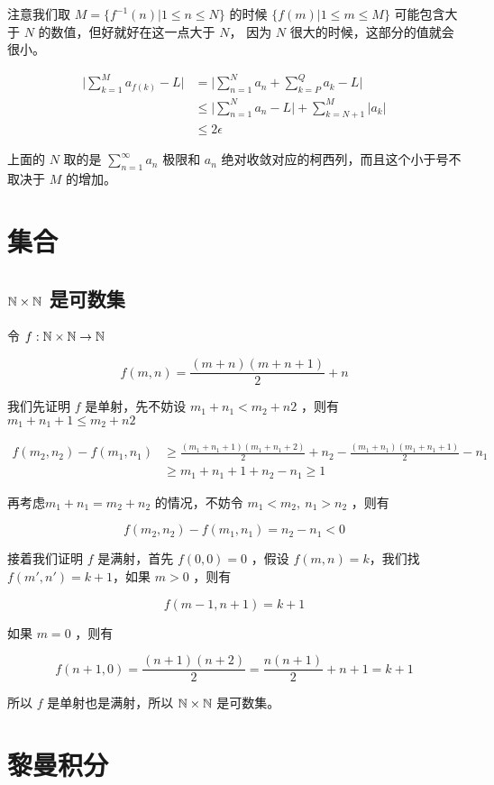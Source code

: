 注意我们取 $M = \{ f^{-1}(n) \vert 1 \le n \le N \} $ 的时候 $ \{ f(m) \vert 1 \le m \le M \}$ 可能包含大于 $N$ 的数值，但好就好在这一点大于 $N$，
因为 $N$ 很大的时候，这部分的值就会很小。

\begin{align*}
\lvert \sum_{k=1}^{M}a_{f(k)} - L \rvert & =  \lvert \sum_{n=1}^{N}a_{n} + \sum_{k=P}^{Q}a_{k} - L \rvert \\
& \le \lvert \sum_{n=1}^{N}a_n - L \rvert + \sum_{k=N+1}^{M}\lvert a_k \rvert \\
& \le 2\epsilon
\end{align*}

上面的 $N$ 取的是 $\sum_{n=1}^{\infty}a_n$ 极限和 $a_n$ 绝对收敛对应的柯西列，而且这个小于号不取决于 $M$ 的增加。


\section{集合}

\subsection{$\mathbb{N} \times \mathbb{N}$ 是可数集}

令 $f: \mathbb{N} \times \mathbb{N} \to \mathbb{N}$

\[
f(m,n) = \frac{(m+n)(m+n+1)}{2} + n
\]

我们先证明 $f$ 是单射，先不妨设 $m_1+ n_1 < m_2 + n2$ ，则有 $ m_1+ n_1 + 1 \le m_2 + n2$

\begin{align*}
f(m_2, n_2) - f(m_1, n_1) & \ge \frac{(m_1+n_1+1)(m_1+n_1 + 2)}{2} + n_2 - \frac{(m_1+n_1)(m_1+n_1+1)}{2} - n_1 \\
    & \ge m_1+n_1+1 + n_2 - n_1 \ge 1
\end{align*}

再考虑$m_1 + n_1 = m_2 + n_2$ 的情况，不妨令 $m_1 < m_2, \: n_1 > n_2$ ，则有

\[
f(m_2,n_2) - f(m_1, n_1) = n_2 - n_1 < 0
\]

接着我们证明 $f$ 是满射，首先 $f(0, 0) = 0$ ，假设 $f(m,n) = k$，我们找 $f(m',n') = k+1$，如果 $m > 0$ ，则有 

\[
f(m-1,n+1) = k +1
\]

如果 $m = 0$ ，则有

\[
f(n+1, 0) = \frac{(n+1)(n+2)}{2} = \frac{n(n+1)}{2} + n + 1 = k + 1
\]

所以 $f$ 是单射也是满射，所以 $\mathbb{N} \times \mathbb{N}$ 是可数集。

\section{黎曼积分}

